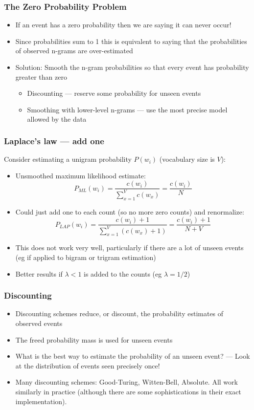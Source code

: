 \begin{frame}
  \frametitle{The Zero Probability Problem}
  \begin{itemize}
  \item If an event has a zero probability then we are saying it can
    never occur!
  \item Since probabilities sum to 1 this is equivalent to saying that
    the probabilities of observed n-grams are over-estimated
  \item Solution: \alert{Smooth} the n-gram probabilities so that
    every event has probability greater than zero
    \begin{itemize}
    \item Discounting --- reserve some probability for unseen events
    \item Smoothing with lower-level n-grams --- use the most precise
      model allowed by the data
    \end{itemize}
  \end{itemize}
\end{frame}

\begin{frame}
  \frametitle{Laplace's law --- add one}

  Consider estimating a unigram probability $P(w_i)$ (vocabulary size
  is $V$):
  \begin{itemize}
  \item<1-> Unsmoothed maximum likelihood estimate:
    \[ P_{ML}(w_i) = \frac{c(w_i)}{\sum_{x=1}^Vc(w_x)} = \frac{c(w_i)}{N}  \]
  \item<2-> Could just add one to each count (so no more zero counts) and
    renormalize:
    \[ P_{LAP}(w_i) = \frac{c(w_i) + 1}{\sum_{x=1}^V(c(w_x)+1)}
    = \frac{c(w_i) + 1}{N+V} \]
  \item<3-> This does not work very well, particularly if there are a
    lot of unseen events (eg if applied to bigram or trigram
    estimation)
  \item<3-> Better results if $\lambda < 1$ is added to the counts (eg
    $\lambda = 1/2$)
  \end{itemize}
\end{frame}

\begin{frame}
  \frametitle{Discounting}
  \begin{itemize}
  \item<1-> \alert{Discounting} schemes reduce, or discount, the
    probability estimates of observed events 
  \item<1-> The freed probability mass is used for unseen events
  \item<2-> What is the best way to estimate the probability of an unseen
    event? --- Look at the distribution of events seen precisely
    once!
  \item<3-> Many discounting schemes: Good-Turing, Witten-Bell, Absolute.
    All work similarly in practice (although there are some
    sophistications in their exact implementation).
  \end{itemize}
\end{frame}

